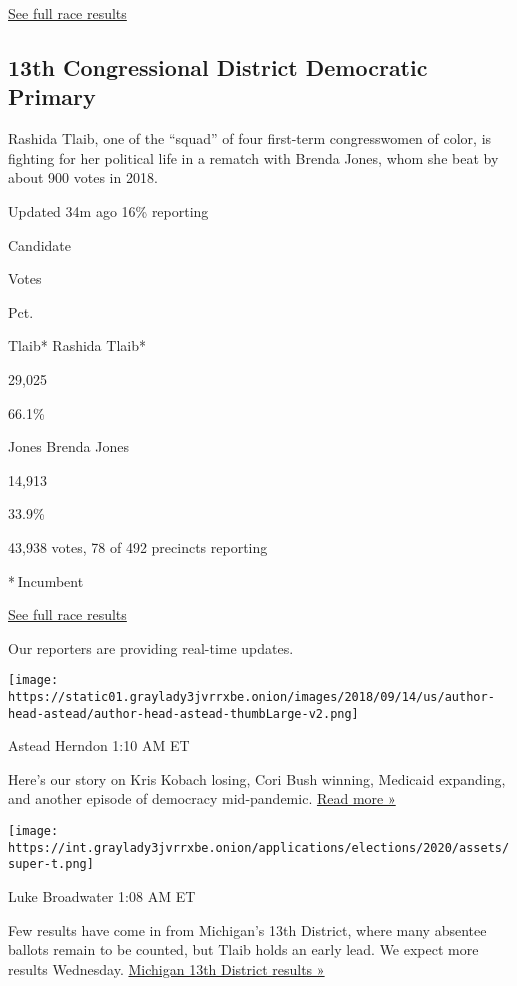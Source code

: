 \href{https://www.nytimes3xbfgragh.onion/interactive/2020/08/04/us/elections/results-michigan-house-district-6-primary-election.html}{See
full race results}

\hypertarget{13th-congressional-district-democratic-primary}{%
\subsection{13th Congressional District Democratic
Primary}\label{13th-congressional-district-democratic-primary}}

Rashida Tlaib, one of the ``squad'' of four first-term congresswomen of
color, is fighting for her political life in a rematch with Brenda
Jones, whom she beat by about 900 votes in 2018.

Updated 34m ago 16\% reporting

Candidate

Votes

Pct.

Tlaib* Rashida Tlaib*

29,025

66.1\%

Jones Brenda Jones

14,913

33.9\%

43,938 votes, 78 of 492 precincts reporting

* Incumbent

\href{https://www.nytimes3xbfgragh.onion/interactive/2020/08/04/us/elections/results-michigan-house-district-13-primary-election.html}{See
full race results}

Our reporters are providing real-time updates.

\texttt{[image: https://static01.graylady3jvrrxbe.onion/images/2018/09/14/us/author-head-astead/author-head-astead-thumbLarge-v2.png]}

Astead Herndon 1:10 AM ET

Here's our story on Kris Kobach losing, Cori Bush winning, Medicaid
expanding, and another episode of democracy mid-pandemic.
\href{https://www.nytimes3xbfgragh.onion/2020/08/04/us/politics/kobach-tlaib.html?action=click\&module=ELEX_results\&pgtype=Interactive\&region=ReporterUpdates}{Read
more »}

\texttt{[image: https://int.graylady3jvrrxbe.onion/applications/elections/2020/assets/super-t.png]}

Luke Broadwater 1:08 AM ET

Few results have come in from Michigan's 13th District, where many
absentee ballots remain to be counted, but Tlaib holds an early lead. We
expect more results Wednesday.
\href{https://www.nytimes3xbfgragh.onion/interactive/2020/08/04/us/elections/results-michigan-house-district-13-primary-election.html?action=click\&module=ELEX_results\&pgtype=Interactive\&region=ReporterUpdates}{Michigan
13th District results »}

